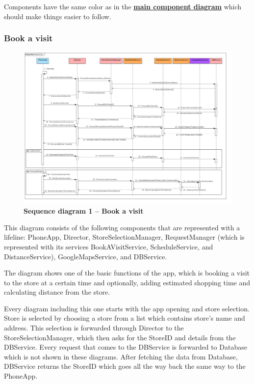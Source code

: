  
Components have the same color as in the  \textbf{\hyperref[fig:componentdiagram1]{main component diagram}} which should make things easier to follow.  

\subsubsection{Book a visit}


\begin{figure}[!h]
\centering
\includegraphics[width=\textwidth]{Images/SequenceDiagramComponents1_BookAVisit}
\caption{\label{fig:seqdiagram1}\textbf{Sequence diagram 1 – Book a visit}}
\end{figure}
\newpage

This diagram consists of the following components that are represented with a lifeline: PhoneApp, Director, StoreSelectionManager, RequestManager (which is represented with its services BookAVisitService, ScheduleService, and DistanceService), GoogleMapsService, and DBService.  

  

The diagram shows one of the basic functions of the app, which is booking a visit to the store at a certain time and optionally, adding estimated shopping time and calculating distance from the store.  

  

Every diagram including this one starts with the app opening and store selection. Store is selected by choosing a store from a list which contains store's name and address. This selection is forwarded through Director to the StoreSelectionManager, which then asks for the StoreID and details from the DBService. Every request that comes to the DBService is forwarded to Database which is not shown in these diagrams. After fetching the data from Database, DBService returns the StoreID which goes all the way back the same way to the PhoneApp.   

